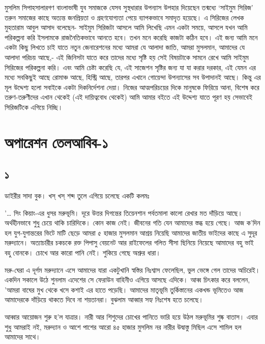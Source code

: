 \documentclass[
]{book}
\begin{document}
মুসলিম সিপাহসালারগণ বাংলাভাষী যুব সমাজকে যেসব সুস্থধারার উপন্যাস উপহার দিয়েছেন তন্মধ্যে `সাইমুম সিরিজ' তরুন সমাজের কাছে অত্যন্ত জনপ্রিয়তা ও গ্রহণযোগ্যতা পেয়ে ব্যাপকভাবে সমাদৃত হয়েছে। এ সিরিজের লেখক মুহতারাম আবুল আসাদ বলেছেন- সাইমুম সিরিজটা আসলে আমি লিখেছি এমন একটা সময়ে, আসলে যখন আমি পরিকল্পনা করি ইসলামকে রাজনৈতিকভাবে আনতে হবে। তখন মনে করেছি কাজটা কঠিন হবে। এই জন্য আমি মনে একটা কিছু লিখতে চাই যাতে নতুন জেনারেশনের মধ্যে আমরা যে আলাদা জাতি, আমরা মুসলমান, আমাদের যে আলাদা পরিচয় আছে,- এই জিনিসটা যাতে করে তাদের মধ্যে সৃষ্টি হয় সেই বিষয়টাকে সামনে রেখে আমি সাইমুম সিরিজের পরিকল্পনা করি। এবং আমি চেষ্টা করেছি যে, এই সাজেশন সৃষ্টির জন্য যা যা করার দরকার, এই যেমন এর মধ্যে সবকিছুই আছে রোমাঞ্চ আছে, হিস্ট্রি আছে, তারপর এখানে গোয়েন্দা উপন্যাসের সব উপাদানই আছে। কিন্তু এর মূল উদ্দেশ্য হলো সবাইকে একটা দিকনির্দেশনা দেয়া। নিজের আত্মপরিচয়ের দিকে মানুষকে ফিরিয়ে আনা, বিশেষ করে তরুণ-তরুণীদের এখান থেকেই (এই দায়িত্ববোধ থেকেই) আমি আমার বইতে এই উদ্দেশ্য যাতে পূরণ হয় সেভাবেই সিরিজটিকে এগিয়ে নিচ্ছি।

\chapter{অপারেশন তেলআবিব-১}\label{operation-tel-aviv-1}

\section*{১}\label{ota-1-1}

ডাইরীর সাদা বুক। খস্ খস্ শব্দ তুলে এগিয়ে চলেছে একটি কলমঃ

'\ldots{} সিং কিয়াং-এর ধুসর মরুভূমি। দূরে উত্তর দিগন্তের তিয়েনশান পর্বতমালা কালো রেখার মত দাঁড়িয়ে আছে। অর্থহীনভাবে শুধু চেয়ে থাকি চারিদিকে। কোন কাজ নেই। জীবনের গতি যেন আমাদের স্তব্ধ হয়ে গেছে। আজ ক'দিন হল যুগ-যুগান্তরের ভিটে মাটি ছেড়ে আমরা ৫ হাজার মুসলমান আশ্রয় নিয়েছি আমাদের জাতীয় ভাইদের কাছে এ সুদূর মরুদ্যানে। অত্যাচারীর চকচকে রক্ত পিপাসু বেয়নেট আর রাইফেলের গলিত সীসা ছিনিয়ে নিয়েছে আমাদের বহু ভাই বহু বোনকে। চোখে আর কারো পানি নেই। শুকিয়ে গেছে অশ্রুর ধারা।

মরু-ঘেরা এ দূর্গম মরুদ্যানে এসে আমাদের যারা একটুখানি স্বস্তির নিঃশ্বাস ফেলেছিল, ভুল ভেঙ্গে গেল তাদের অচিরেই। একদিন সকালে উঠে শুনলাম এদেশের সে ফেরাউন বাহিনীও এগিয়ে আসছে এদিকে। আব্ব চিৎকার করে বললেন, 'আমরা বাঘের মুখ থেকে খসে কশাই এর হাতে পড়েছি। আমাদের মাতৃভূমি তুর্কিস্তানের একখন্ড ভূমিতেও আজ আমাদেরকে দাঁড়িয়ে থাকতে দিবে না শয়তানরা। বুঝলাম আব্বার সহ্য নিঃশেষ হতে চলেছে।

আব্বার আয়োজন শুরু হ'ল যাত্রার। নারী আর শিশুদের চোখের পানিতে ভারি হয়ে উঠল মরুভূমির শুষ্ক বাতাস। এবার শুধু আমরাই নই, মরুদ্যান ও আশে পাশের আরো ৪৫ হাজার মুসলিম নর নারীর উদ্বাস্তু মিছিল এসে শামিল হল আমাদের সাথে।
\end{document}
